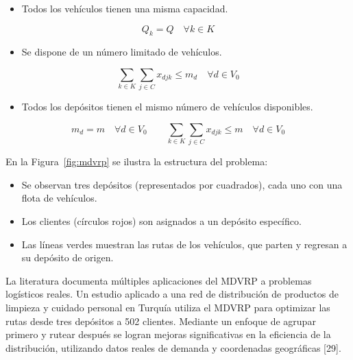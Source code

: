 \begin{itemize}
  \item Todos los veh\'iculos tienen una misma capacidad.
\end{itemize}
\begin{equation}
Q_{k} = Q \quad \forall k \in K
\end{equation}

\begin{itemize}
  \item Se dispone de un n\'umero limitado de veh\'iculos.
\end{itemize}
\begin{equation}
\sum_{k \in K}{\sum_{j \in C}{x_{djk}}} \leq m_{d} \quad \forall d \in V_{0}
\end{equation}

\begin{itemize}
  \item Todos los dep\'ositos tienen el mismo n\'umero de veh\'iculos disponibles.
\end{itemize}
\begin{equation}
m_{d} = m \quad \forall d \in V_{0} \qquad \sum_{k \in K}{\sum_{j \in C}{x_{djk}}} \leq m \quad \forall d \in V_{0}
\end{equation}

En la Figura~\ref{fig:mdvrp} se ilustra la estructura del problema:

\begin{itemize}
  \item Se observan tres dep\'ositos (representados por cuadrados), cada uno con una flota de veh\'iculos.
  \item Los clientes (c\'irculos rojos) son asignados a un dep\'osito espec\'ifico.
  \item Las l\'ineas verdes muestran las rutas de los veh\'iculos, que parten y regresan a su dep\'osito de origen.
\end{itemize}


La literatura documenta m\'ultiples aplicaciones del MDVRP a problemas log\'isticos reales. Un estudio aplicado a una red de distribuci\'on de productos de limpieza y cuidado personal en Turqu\'ia utiliza el MDVRP para optimizar las rutas desde tres dep\'ositos a 502 clientes. Mediante un enfoque de agrupar primero y rutear despu\'es se logran mejoras significativas en la eficiencia de la distribuci\'on, utilizando datos reales de demanda y coordenadas geogr\'aficas [29].

